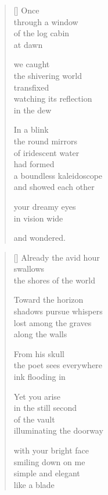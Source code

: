 \documentclass[14pt]{extbook}
\newcommand*{\centeredornament}{\centerline{\pgfornament[width=6cm]{88}}}
\begin{document}
\newpage

\vspace*{-15mm}
\centeredornament
\vspace*{-7mm}


\settowidth{\versewidth}{a boundless kaleidoscope}

\begin{verse}[\versewidth]
  Once \\
  through a window \\
  of the log cabin \\
  at dawn

  we caught \\
  the shivering world \\
  transfixed \\
  watching its reflection \\
  in the dew

  In a blink \\
  the round mirrors \\
  of iridescent water \\
  had formed \\
  a boundless kaleidoscope \\
  and showed each other

  your dreamy eyes \\
  in vision wide

  and wondered.
\end{verse}


\newpage

\vspace*{-15mm}
\centeredornament
\vspace*{-7mm}


\settowidth{\versewidth}{shadows pursue whispers}

\begin{verse}[\versewidth]
  Already the avid hour \\
  swallows \\
  the shores of the world

  Toward the horizon \\
  shadows pursue whispers \\
  lost among the graves \\
  along the walls

  From his skull \\
  the poet sees everywhere \\
  ink flooding in

  Yet you arise \\
  in the still second \\
  of the vault \\
  illuminating the doorway

  with your bright face \\
  smiling down on me \\
  simple and elegant \\
  like a blade
\end{verse}
\end{document}
